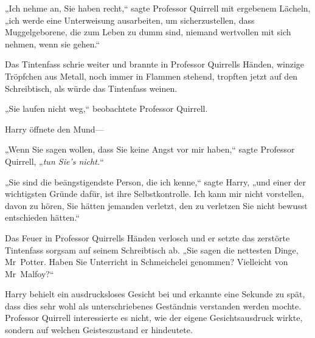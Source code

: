 „Ich nehme an, Sie haben recht,“ sagte Professor Quirrell mit ergebenem Lächeln, „ich werde eine Unterweisung ausarbeiten, um sicherzustellen, dass Muggelgeborene, die zum Leben zu dumm sind, niemand wertvollen mit sich nehmen, wenn sie gehen.“

Das Tintenfass schrie weiter und brannte in Professor Quirrells Händen, winzige Tröpfchen aus Metall, noch immer in Flammen stehend, tropften jetzt auf den Schreibtisch, als würde das Tintenfass weinen.

„Sie laufen nicht weg,“ beobachtete Professor Quirrell.

Harry öffnete den Mund—

„Wenn Sie sagen wollen, dass Sie keine Angst vor mir haben,“ sagte Professor Quirrell, „\emph{tun Sie's nicht.}“

„Sie sind die beängstigendste Person, die ich kenne,“ sagte Harry, „und einer der wichtigsten Gründe dafür, ist ihre Selbstkontrolle. Ich kann mir nicht vorstellen, davon zu hören, Sie hätten jemanden verletzt, den zu verletzen Sie nicht bewusst entschieden hätten.“

Das Feuer in Professor Quirrells Händen verlosch und er setzte das zerstörte Tintenfass sorgsam auf seinem Schreibtisch ab. „Sie sagen die nettesten Dinge, Mr~Potter. Haben Sie Unterricht in Schmeichelei genommen? Vielleicht von Mr~Malfoy?“

Harry behielt ein ausdrucksloses Gesicht bei und erkannte eine Sekunde zu spät, dass dies sehr wohl als unterschriebenes Geständnis verstanden werden mochte. Professor Quirrell interessierte es nicht, wie der eigene Gesichtsausdruck wirkte, sondern auf welchen Geisteszustand er hindeutete.

